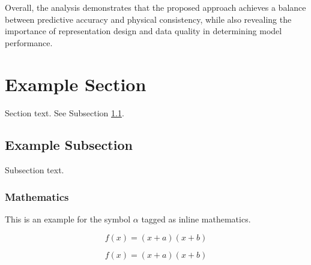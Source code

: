 \documentclass[preprint,12pt]{elsarticle}
\begin{document}
Overall, the analysis demonstrates that the proposed approach achieves a balance between predictive accuracy and physical consistency, while also revealing the importance of representation design and data quality in determining model performance. 


\section{Example Section}
\label{sec1}

Section text. See Subsection \ref{subsec1}.

\subsection{Example Subsection}
\label{subsec1}

Subsection text.


\subsubsection{Mathematics}
This is an example for the symbol $\alpha$ tagged as inline mathematics.

\begin{equation}
f(x) = (x+a)(x+b)
\end{equation}

\begin{equation*}
f(x) = (x+a)(x+b)
\end{equation*}
\end{document}
